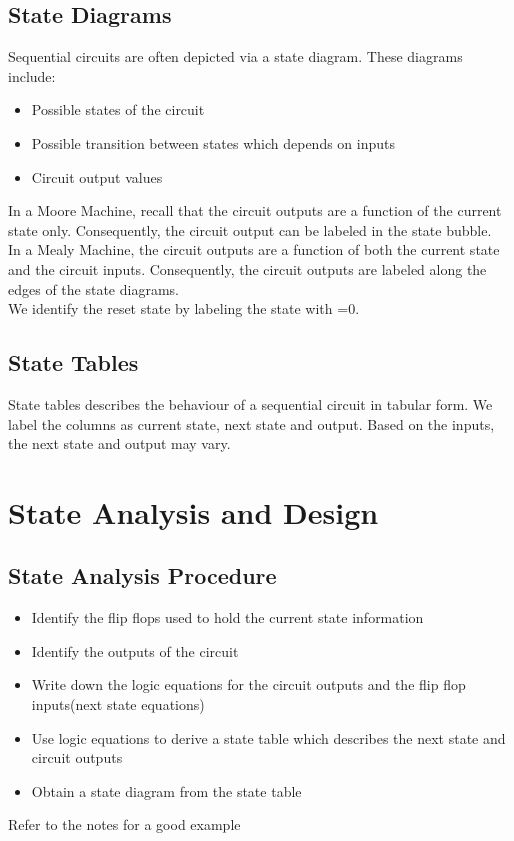 \documentclass[12pt]{report}
\begin{document}
	\section{State Diagrams}
		Sequential circuits are often depicted via a state diagram. These diagrams include:\\
		\begin{itemize}
			\item Possible states of the circuit
			\item Possible transition between states which depends on inputs
			\item Circuit output values
		\end{itemize}
		In a Moore Machine,	recall that the circuit outputs are a function of the current state only. Consequently, the circuit output can be labeled in the state bubble.\\
		In a Mealy Machine, the circuit outputs are a function of both the current state and the circuit inputs. Consequently, the circuit outputs are labeled along the edges of the state diagrams.
		\\
		We identify the reset state by labeling the state with =0.
	\section{State Tables}
		State tables describes the behaviour of a sequential circuit in tabular form. We label the columns as current state, next state and output. Based on the inputs, the next state and output may vary.
\chapter{State Analysis and Design}
	\section{State Analysis Procedure}
		\begin{itemize}
			\item Identify the flip flops used to hold the current state information
			\item Identify the outputs of the circuit
			\item Write down the logic equations for the circuit outputs and the flip flop inputs(next state equations)
			\item Use logic equations to derive a state table which describes the next state and circuit outputs
			\item Obtain a state diagram from the state table
		\end{itemize}
		Refer to the notes for a good example
\end{document}
